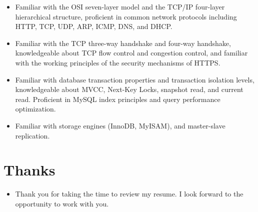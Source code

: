 \documentclass{resume}
\newcommand{\en}[1]{#1}
\newcommand{\zh}[1]{}
\begin{document}
\begin{itemize}[parsep=0.25ex]
     \item \en{Familiar with the OSI seven-layer model and the TCP/IP four-layer hierarchical structure, proficient in common network protocols including HTTP, TCP, UDP, ARP, ICMP, DNS, and DHCP.}
           \zh{熟悉数据库事务特性、事务隔离级别，了解 MVCC、Next-Key Locks、快照读与当前读}

     \item \en{Familiar with the TCP three-way handshake and four-way handshake, knowledgeable about TCP flow control and congestion control, and familiar with the working principles of the security mechanisms of HTTPS.}
           \zh{熟悉 Redis 数据类型，了解过期键删除、数据淘汰策略、RDB 和 AOF 持久化机制}

     \item \en{Familiar with database transaction properties and transaction isolation levels, knowledgeable about MVCC, Next-Key Locks, snapshot read, and current read. Proficient in MySQL index principles and query performance optimization.}
           \zh{熟悉 TCP 三次握手和四次挥手，了解 TCP 流量控制和拥塞控制，了解 TLS的安全机制的工作原理}

     \item \en{Familiar with storage engines (InnoDB, MyISAM), and master-slave replication.}
           \zh{积极探索如ChatGPT 4和GitHub Copilot等LLM工具，提升编码效率。持续学习，通过技术博客、开源项目保持技术前沿，激发创新热情，适应技术变革。}
\end{itemize}

\section{\en{Thanks}\zh{致谢}}
\begin{itemize}
     \item \en{Thank you for taking the time to review my resume. I look forward to the opportunity to work with you.}
           \zh{感谢您花时间阅读我的简历，期待能有机会和您共事}
\end{itemize}
\end{document}
